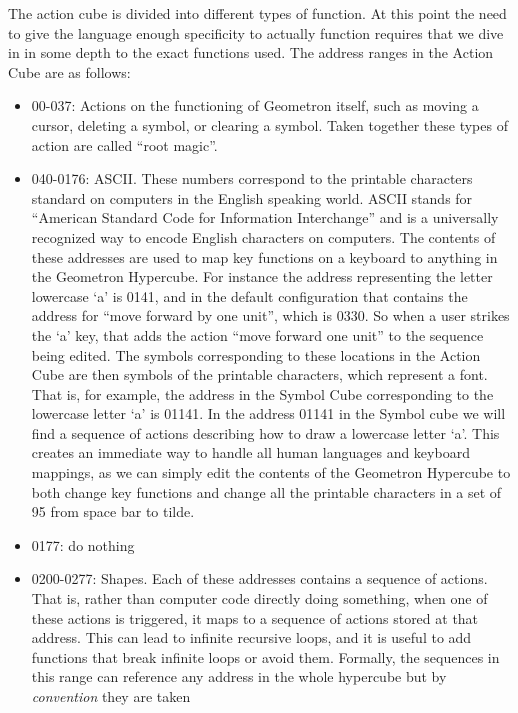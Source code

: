 The action cube is divided into different types of function. At this
point the need to give the language enough specificity to actually
function requires that we dive in in some depth to the exact functions
used. The address ranges in the Action Cube are as follows:

\begin{itemize}
\tightlist
\item
  00-037: Actions on the functioning of Geometron itself, such as moving
  a cursor, deleting a symbol, or clearing a symbol. Taken together
  these types of action are called ``root magic''.
\item
  040-0176: ASCII. These numbers correspond to the printable characters
  standard on computers in the English speaking world. ASCII stands for
  ``American Standard Code for Information Interchange'' and is a
  universally recognized way to encode English characters on computers.
  The contents of these addresses are used to map key functions on a
  keyboard to anything in the Geometron Hypercube. For instance the
  address representing the letter lowercase `a' is 0141, and in the
  default configuration that contains the address for ``move forward by
  one unit'', which is 0330. So when a user strikes the `a' key, that
  adds the action ``move forward one unit'' to the sequence being
  edited. The symbols corresponding to these locations in the Action
  Cube are then symbols of the printable characters, which represent a
  font. That is, for example, the address in the Symbol Cube
  corresponding to the lowercase letter `a' is 01141. In the address
  01141 in the Symbol cube we will find a sequence of actions describing
  how to draw a lowercase letter `a'. This creates an immediate way to
  handle all human languages and keyboard mappings, as we can simply
  edit the contents of the Geometron Hypercube to both change key
  functions and change all the printable characters in a set of 95 from
  space bar to tilde.
\item
  0177: do nothing
\item
  0200-0277: Shapes. Each of these addresses contains a sequence of
  actions. That is, rather than computer code directly doing something,
  when one of these actions is triggered, it maps to a sequence of
  actions stored at that address. This can lead to infinite recursive
  loops, and it is useful to add functions that break infinite loops or
  avoid them. Formally, the sequences in this range can reference any
  address in the whole hypercube but by \emph{convention} they are taken

\end{itemize}
